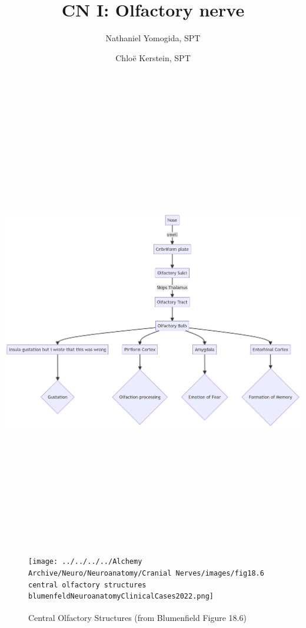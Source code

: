 \documentclass[
  letterpaper,
  DIV=11,
  numbers=noendperiod]{scrartcl}
\title{CN I: Olfactory nerve}
\author{Nathaniel Yomogida, SPT \and Chloë Kerstein, SPT}
\date{}
\renewcommand*\contentsname{Table of contents}
\newcommand\contentsname{Table of contents}
\begin{document}
\maketitle

\renewcommand*\contentsname{Table of contents}
{
\hypersetup{linkcolor=}
\setcounter{tocdepth}{3}
\tableofcontents
}
\includegraphics[width=10.93in,height=7.92in]{CN1_Olfactory_files/figure-latex/mermaid-figure-1.png}

\begin{figure}[H]

{\centering \texttt{[image: ../../../../Alchemy Archive/Neuro/Neuroanatomy/Cranial Nerves/images/fig18.6 central olfactory structures blumenfeldNeuroanatomyClinicalCases2022.png]}

}

\caption{Central Olfactory Structures (from Blumenfield Figure
18.6\textsuperscript{})}

\end{figure}%
\end{document}
